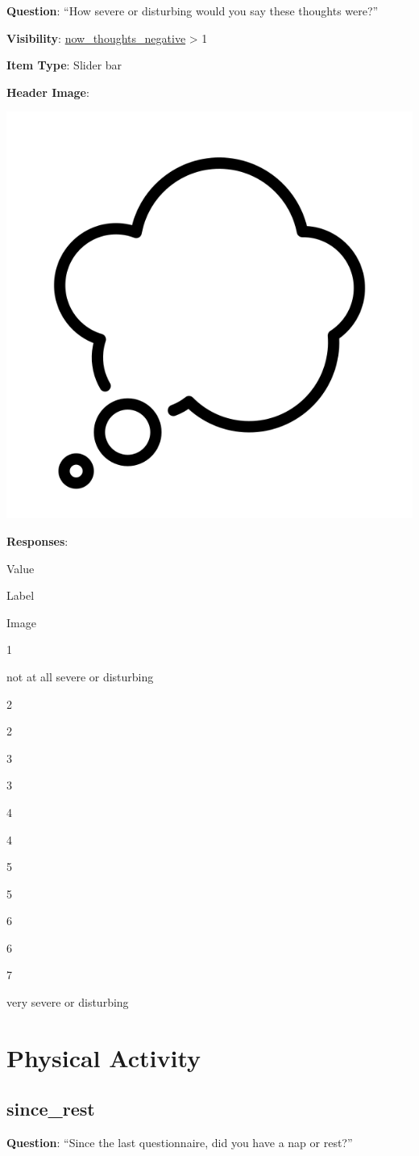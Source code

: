 \documentclass[]{book}
\begin{document}
\textbf{Question}: ``How severe or disturbing would you say these thoughts were?''

\textbf{Visibility}: \protect\hyperlink{now_thoughts_negative}{now\_thoughts\_negative} \textgreater{} 1

\textbf{Item Type}: Slider bar

\textbf{Header Image}:

\begin{flushleft}\includegraphics[width=0.33\linewidth]{downloadFigs4latex_NIMH_Applet_Codebook/now_thoughts_negative_severity_headerImg} \end{flushleft}

\textbf{Responses}:

Value

Label

Image

1

not at all severe or disturbing

2

2

3

3

4

4

5

5

6

6

7

very severe or disturbing

\hypertarget{activity_section}{%
\chapter{Physical Activity}\label{activity_section}}

\hypertarget{since_rest}{%
\section{since\_rest}\label{since_rest}}

\textbf{Question}: ``Since the last questionnaire, did you have a nap or rest?''
\end{document}
